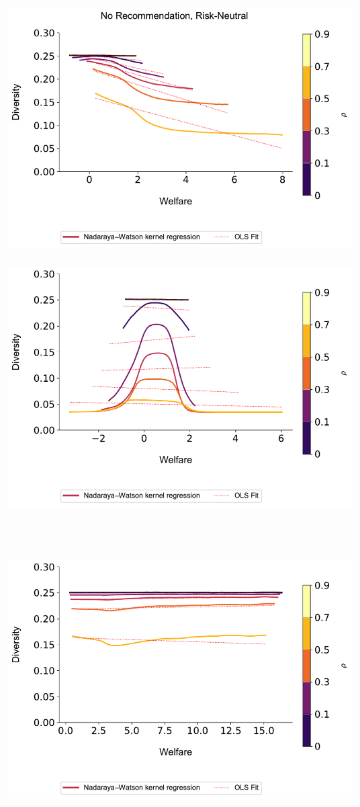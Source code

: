 \documentclass[manuscript]{acmart}
\begin{document}
\begin{figure}[t]
\caption{Diversity vs. Welfare}
\begin{subfigure}{.3\textwidth}
\includegraphics[width=1.0\linewidth]{figures/diversity_welfare_rn_n_200.pdf}
\end{subfigure}
\begin{subfigure}{.3\textwidth}
\includegraphics[width=1.0\linewidth]{figures/diversity_welfare_ra_n_200.pdf}
\end{subfigure}\\
\begin{subfigure}{.3\textwidth}
\includegraphics[width=1.0\linewidth]{figures/diversity_welfare_rn_partial_n_200.pdf}

\end{subfigure}
\end{figure}
\end{document}
